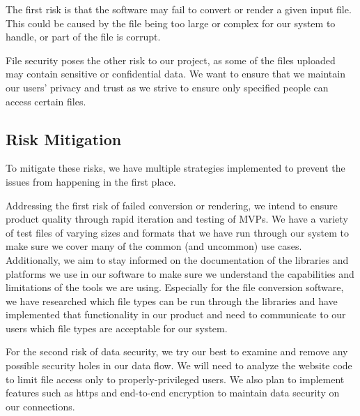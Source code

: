 The first risk is that the software may fail to convert or render a given input file.
This could be caused by the file being too large or complex for our system to handle, or part of the file is corrupt. 

File security poses the other risk to our project, as some of the files uploaded may contain sensitive or confidential data.
We want to ensure that we maintain our users' privacy and trust as we strive to ensure only specified people can access certain files.
\subsection{Risk Mitigation}
To mitigate these risks, we have multiple strategies implemented to prevent the issues from happening in the first place.

Addressing the first risk of failed conversion or rendering, we intend to ensure product quality through rapid iteration and testing of MVPs. 
We have a variety of test files of varying sizes and formats that we have run through our system to make sure we cover many of the common (and uncommon) use cases.
Additionally, we aim to stay informed on the documentation of the libraries and platforms we use in our software to make sure we understand the capabilities and limitations of the tools we are using.
Especially for the file conversion software, we have researched which file types can be run through the libraries and have implemented that functionality in our product and need to communicate to our users which file types are acceptable for our system. 

For the second risk of data security, we try our best to examine and remove any possible security holes in our data flow.
We will need to analyze the website code to limit file access only to properly-privileged users. 
We also plan to implement features such as https and end-to-end encryption to maintain data security on our connections.